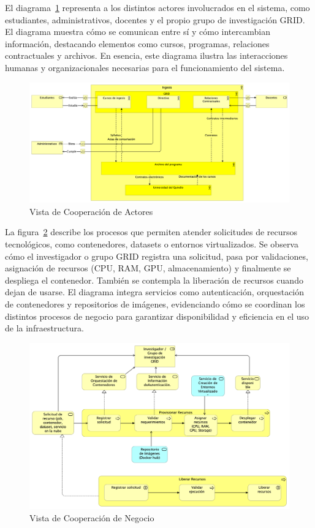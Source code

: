 El diagrama~\ref{fig:vista-cooperacion-actores} representa a los distintos actores involucrados en el sistema, como estudiantes, administrativos, docentes y el propio grupo de investigación GRID. El diagrama muestra cómo se comunican entre sí y cómo intercambian información, destacando elementos como cursos, programas, relaciones contractuales y archivos. En esencia, este diagrama ilustra las interacciones humanas y organizacionales necesarias para el funcionamiento del sistema.

\begin{figure}[H]
    \centering
    \includegraphics[width=\textwidth]{tablas-images/cp6/Actor-Cooperation-view.png}
    \caption{Vista de Cooperación de Actores}\label{fig:vista-cooperacion-actores}
\end{figure}

La figura~\ref{fig:vista-cooperacion-negocio} describe los procesos que permiten atender solicitudes de recursos tecnológicos, como contenedores, datasets o entornos virtualizados. Se observa cómo el investigador o grupo GRID registra una solicitud, pasa por validaciones, asignación de recursos (CPU, RAM, GPU, almacenamiento) y finalmente se despliega el contenedor. También se contempla la liberación de recursos cuando dejan de usarse. El diagrama integra servicios como autenticación, orquestación de contenedores y repositorios de imágenes, evidenciando cómo se coordinan los distintos procesos de negocio para garantizar disponibilidad y eficiencia en el uso de la infraestructura.

\begin{figure}[H]
    \centering
    \includegraphics[width=\textwidth]{tablas-images/cp6/Business-Cooperation-View.png}
    \caption{Vista de Cooperación de Negocio}\label{fig:vista-cooperacion-negocio}
\end{figure}

